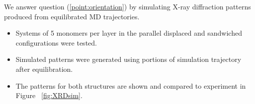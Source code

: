 \documentclass{article}
\newcommand{\angstrom}{\textup{\AA}}
\begin{document}

  We answer question (\ref{point:orientation}) by simulating X-ray diffraction patterns produced from
  equilibrated MD trajectories.
  \begin{itemize}
	\item Systems of 5 monomers per layer in the parallel displaced and sandwiched
	configurations were tested.
        \item Simulated patterns were generated using portions of simulation
        trajectory after equilibration.
        \item The patterns for both structures are shown and compared to experiment
	in Figure ~\ref{fig:XRDsim}.
  \end{itemize}
%
\end{document}

